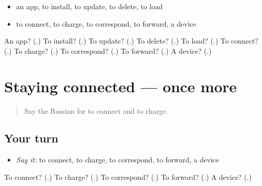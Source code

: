 \begin{itemize}
\raggedright
  \item an app, to install, to update, to delete, to load
  \item to connect, to charge, to correspond, to forward, a device
\end{itemize}

\begin{tcolorbox}[breakable,colback=teal!4,colframe=teal!35!black,title={Before you move on}]
An app? (\textbf{}.) To install? (\textbf{}.) To update? (\textbf{}.) To delete? (\textbf{}.) To load? (\textbf{}.) To connect? (\textbf{}.) To charge? (\textbf{}.) To correspond? (\textbf{}.) To forward? (\textbf{}.) A device? (\textbf{}.)
\end{tcolorbox}
\section[(dialogue)]{Staying connected — once more}

\label{lesson:RU-R402-review-final-402}



\begin{quote}
Say the Russian for to connect and to charge.
\end{quote}

\subsection*{Your turn}
\begin{itemize}
\raggedright
  \item \emph{Say it:} to connect, to charge, to correspond, to forward, a device
\end{itemize}

\begin{tcolorbox}[breakable,colback=teal!4,colframe=teal!35!black,title={Before you move on}]
To connect? (\textbf{}.) To charge? (\textbf{}.) To correspond? (\textbf{}.) To forward? (\textbf{}.) A device? (\textbf{}.)
\end{tcolorbox}

